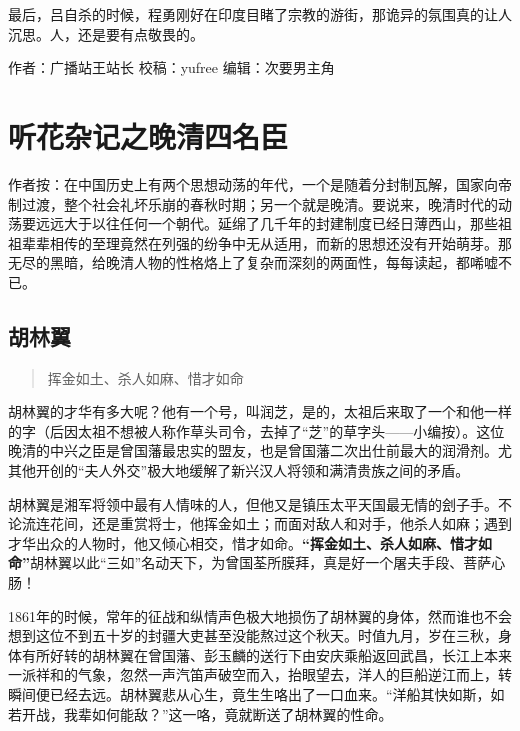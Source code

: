 \documentclass[
]{book}
\begin{document}
最后，吕自杀的时候，程勇刚好在印度目睹了宗教的游街，那诡异的氛围真的让人沉思。人，还是要有点敬畏的。

作者：广播站王站长
校稿：yufree
编辑：次要男主角

\hypertarget{ux542cux82b1ux6742ux8bb0ux4e4bux665aux6e05ux56dbux540dux81e3}{%
\section{听花杂记之晚清四名臣}\label{ux542cux82b1ux6742ux8bb0ux4e4bux665aux6e05ux56dbux540dux81e3}}

作者按：在中国历史上有两个思想动荡的年代，一个是随着分封制瓦解，国家向帝制过渡，整个社会礼坏乐崩的春秋时期；另一个就是晚清。要说来，晚清时代的动荡要远远大于以往任何一个朝代。延绵了几千年的封建制度已经日薄西山，那些祖祖辈辈相传的至理竟然在列强的纷争中无从适用，而新的思想还没有开始萌芽。那无尽的黑暗，给晚清人物的性格烙上了复杂而深刻的两面性，每每读起，都唏嘘不已。

\hypertarget{ux80e1ux6797ux7ffc}{%
\subsection{胡林翼}\label{ux80e1ux6797ux7ffc}}

\begin{quote}
挥金如土、杀人如麻、惜才如命
\end{quote}

胡林翼的才华有多大呢？他有一个号，叫润芝，是的，太祖后来取了一个和他一样的字（后因太祖不想被人称作草头司令，去掉了``芝''的草字头------小编按）。这位晚清的中兴之臣是曾国藩最忠实的盟友，也是曾国藩二次出仕前最大的润滑剂。尤其他开创的``夫人外交''极大地缓解了新兴汉人将领和满清贵族之间的矛盾。

胡林翼是湘军将领中最有人情味的人，但他又是镇压太平天国最无情的刽子手。不论流连花间，还是重赏将士，他挥金如土；而面对敌人和对手，他杀人如麻；遇到才华出众的人物时，他又倾心相交，惜才如命。\textbf{``挥金如土、杀人如麻、惜才如命''}胡林翼以此``三如''名动天下，为曾国荃所膜拜，真是好一个屠夫手段、菩萨心肠！

1861年的时候，常年的征战和纵情声色极大地损伤了胡林翼的身体，然而谁也不会想到这位不到五十岁的封疆大吏甚至没能熬过这个秋天。时值九月，岁在三秋，身体有所好转的胡林翼在曾国藩、彭玉麟的送行下由安庆乘船返回武昌，长江上本来一派祥和的气象，忽然一声汽笛声破空而入，抬眼望去，洋人的巨船逆江而上，转瞬间便已经去远。胡林翼悲从心生，竟生生咯出了一口血来。``洋船其快如斯，如若开战，我辈如何能敌？''这一咯，竟就断送了胡林翼的性命。
\end{document}
